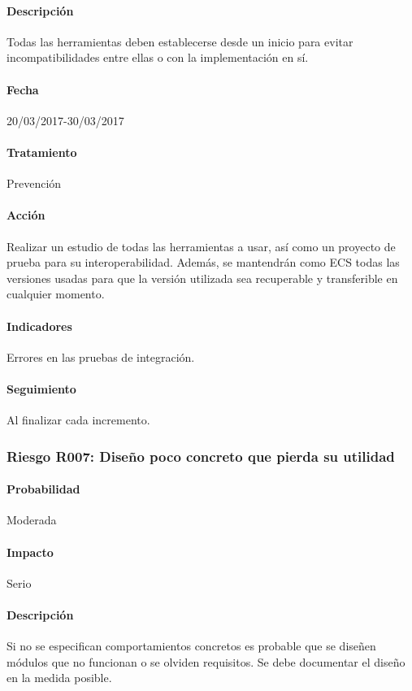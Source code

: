 \documentclass[10pt,a4paper]{article}
\begin{document}
				\paragraph{Descripción} Todas las herramientas deben establecerse desde un inicio para evitar incompatibilidades entre ellas o con la implementación en sí.
				\paragraph{Fecha} 20/03/2017-30/03/2017 %
				\paragraph{Tratamiento} Prevención %
				\paragraph{Acción} Realizar un estudio de todas las herramientas a usar, así como un proyecto de prueba para su interoperabilidad. Además, se mantendrán como ECS todas las versiones usadas para que la versión utilizada sea recuperable y transferible en cualquier momento. %
				\paragraph{Indicadores} Errores en las pruebas de integración. %
				\paragraph{Seguimiento}	Al finalizar cada incremento. %
				
			\subsubsection{Riesgo R007: Diseño poco concreto que pierda su utilidad}
				\paragraph{Probabilidad} Moderada
				\paragraph{Impacto}	Serio
				\paragraph{Descripción} Si no se especifican comportamientos concretos es probable que se diseñen módulos que no funcionan o se olviden requisitos. Se debe documentar el diseño en la medida posible.
\end{document}
